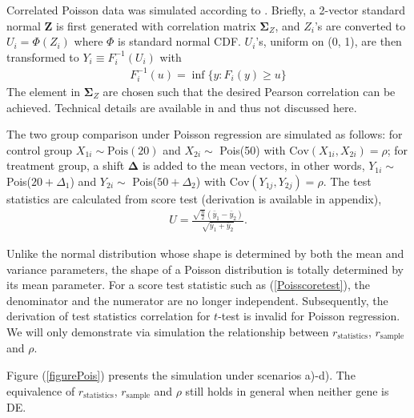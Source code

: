 \documentclass[12pt, a4paper]{article}
\begin{document}
	
	
	Correlated Poisson data was simulated according to \cite{madsen2013simulating}. Briefly, a 2-vector
	standard normal $\bm Z$ is first generated with correlation matrix $\bm \Sigma_Z$, and $Z_i$'s are
	converted to $U_i= \Phi(Z_i)$ where $\Phi$ is standard normal CDF. $U_i$'s, uniform on (0, 1), are
	then transformed to $Y_i \equiv F_i^{-1}(U_i)$ with 
	\begin{align}\label{inverseSim}
		F_i^{-1}(u) = \inf \{y: F_i(y)\geq u\}
	\end{align}
	The element in $\bm \Sigma_Z$ are chosen such that the desired Pearson correlation can be achieved.
	Technical details are available in \cite{madsen2013simulating} and thus not discussed here. 
	
	The two group comparison under Poisson regression are simulated as follows: for control group
	$X_{1i} \sim \text{Pois}(20)$ and $X_{2i}\sim $ Pois(50)   with $\text{Cov}(X_{1i}, X_{2i}) = \rho$;
	for treatment group, a shift $\bm \Delta$ is added to the mean vectors, in other words, $Y_{1i} \sim
	$ Pois($20 + \Delta_1$) and $Y_{2i} \sim $ Pois($50 + \Delta_2$) with $\text{Cov}(Y_{1j}, Y_{2j}) =
	\rho$. The test statistics are calculated from score test (derivation is available in appendix),
	\begin{align}\label{Poisscoretest}
		U = \frac{\sqrt{\frac{n}{2}}(\bar{y}_1- \bar{y}_2)}{\sqrt{\bar{y}_1 + \bar{y}_2}}.
	\end{align}
	
	Unlike the normal distribution whose shape is determined by both the mean and variance parameters,
	the shape of a Poisson distribution is totally determined by its mean parameter. For a score test
	statistic such as (\ref{Poisscoretest}), the denominator and the numerator are no longer
	independent. Subsequently, the derivation of test statistics correlation for $t$-test is invalid for
	Poisson regression. We will only demonstrate via simulation the relationship between 
	$r_\text{statistics}$, $r_{\text{sample}}$ and $\rho$.
	
	Figure (\ref{figurePois}) presents the simulation under scenarios a)-d). The equivalence of
	$r_\text{statistics}$, $r_{\text{sample}}$ and $\rho$ still holds in general when neither gene is
	DE.  
	
\end{document}
